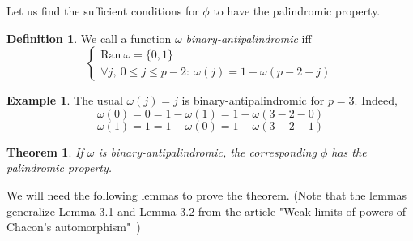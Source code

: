 \documentclass[a4paper]{article}
\theoremstyle{plain}
\newtheorem{theorem}{Theorem}[section]
\theoremstyle{definition}
\newtheorem{definition}{Definition}
\newtheorem{example}{Example}
\begin{document}
    Let us find the sufficient conditions for $\phi$ to have the palindromic property.
    
\begin{definition}
We call a function $\omega$  \textit{binary-antipalindromic} iff
\[\begin{cases}
	\mathrm{Ran }\ \omega = \{0,1\} \\
	\forall j,\ 0 \le j \le p-2: \  \omega(j) = 1 - \omega(p-2-j)
\end{cases}\]
\end{definition}


\begin{example}
The usual $\omega(j)=j$ is binary-antipalindromic for $p = 3$. Indeed,
$$
\omega(0) = 0 = 1 - \omega(1) = 1 - \omega(3 - 2 - 0)
$$
$$
\omega(1) = 1 = 1 - \omega(0) = 1 - \omega(3 - 2 - 1)
$$
\end{example}

\begin{theorem}
If $\omega$ is binary-antipalindromic, the corresponding $\phi$ has the palindromic property.
\end{theorem}

We will need the following lemmas to prove the theorem. (Note that the lemmas generalize Lemma 3.1 and Lemma 3.2 from the article "Weak limits of powers of Chacon's automorphism"\ )
\end{document}
